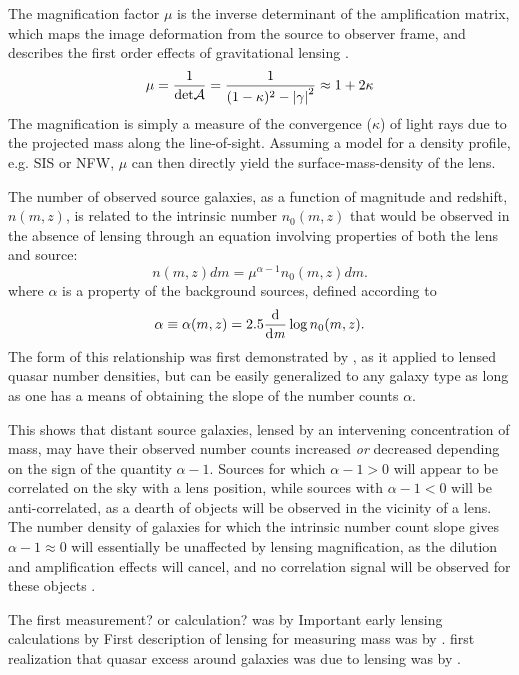 The magnification factor $\mu$ is the inverse determinant of the amplification matrix, which maps the image deformation from the source to observer frame, and describes the first order effects of gravitational lensing \citep{BS01}.
\begin{equation}
\mu = \frac{1}{\mathrm{det} \cal{A}} = 
\frac{1}{(1-\kappa)^2 - \left|\gamma\right|^2} \approx 1+2\kappa
\label{mu}
\end{equation}
The magnification is simply a measure of the convergence ($\kappa$) of light rays due to the projected mass along the line-of-sight.  Assuming a model for a density profile, e.g. SIS or NFW, $\mu$ can then directly yield the surface-mass-density of the lens.

The number of observed source galaxies, as a function of magnitude and redshift, $n(m,z)$, is related to the intrinsic number $n_0(m,z)$ that would be observed in the absence of lensing through an equation involving properties of both the lens and source:
\begin{equation}
n(m,z)dm = \mu ^{\alpha -1} n_0(m,z)dm.
\end{equation}
where $\alpha$ is a property of the background sources, defined according to
\begin{equation}
\alpha \equiv \alpha(m,z) = 2.5 \frac{\mathrm d}{\mathrm d \it m} \log n_0(m,z).
\label{alpha}
\end{equation}
The form of this relationship was first demonstrated by \citet{Narayan89}, as it applied to lensed quasar number densities, but can be easily generalized to any galaxy type as long as one has a means of obtaining the slope of the number counts $\alpha$.

This shows that distant source galaxies, lensed by an intervening concentration of mass, may have their observed number counts increased {\it or} decreased depending on the sign of the quantity $\alpha -1$.  Sources for which $\alpha -1 > 0$ will appear to be correlated on the sky with a lens position, while sources with $\alpha -1 < 0$ will be anti-correlated, as a dearth of objects will be observed in the vicinity of a lens.  The number density of galaxies for which the intrinsic number count slope gives $\alpha -1 \approx 0$ will essentially be unaffected by lensing magnification, as the dilution and amplification effects will cancel, and no correlation signal will be observed for these objects \citep{Scranton05}.

The first measurement? or calculation? was by \citet{Broadhurst95}
Important early lensing calculations by \citet{KS93} First description of lensing for measuring mass was by \citet{Tyson84}. first realization that quasar excess around galaxies was due to lensing was by \citet{Narayan89}.

